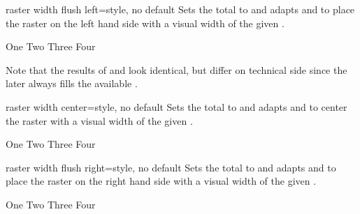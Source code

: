 \clearpage
\begin{docTcbKey}[][doc new=2018-11-30]{raster width flush left}{=}{style, no default}
  Sets the total  to  and adapts
   and  to
  place the raster on the left hand side
  with a visual width of the given .
\begin{dispExample}
\begin{tcbitemize}[raster width flush left=\linewidth/2,
  size=small,colframe=red!50!black,colback=red!10!white]
  \tcbitem One
  \tcbitem Two
  \tcbitem Three
  \tcbitem Four
\end{tcbitemize}
\end{dispExample}
Note that the results of  and 
look identical, but differ on technical side since the later always fills
the available .
\end{docTcbKey}


\begin{docTcbKey}[][doc new=2018-11-30]{raster width center}{=}{style, no default}
  Sets the total  to  and adapts
   and  to center
  the raster with a visual width of the given .
\begin{dispExample}
\begin{tcbitemize}[raster width center=\linewidth/2,
  size=small,colframe=red!50!black,colback=red!10!white]
  \tcbitem One
  \tcbitem Two
  \tcbitem Three
  \tcbitem Four
\end{tcbitemize}
\end{dispExample}
\end{docTcbKey}


\begin{docTcbKey}[][doc new=2018-11-30]{raster width flush right}{=}{style, no default}
  Sets the total  to  and adapts
   and  to
  place the raster on the right hand side
  with a visual width of the given .
\begin{dispExample}
\begin{tcbitemize}[raster width flush right=\linewidth/2,
  size=small,colframe=red!50!black,colback=red!10!white]
  \tcbitem One
  \tcbitem Two
  \tcbitem Three
  \tcbitem Four
\end{tcbitemize}
\end{dispExample}
\end{docTcbKey}


